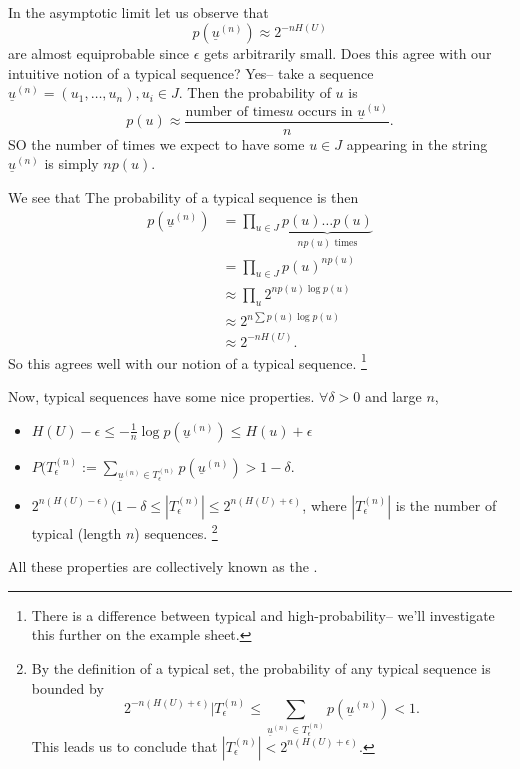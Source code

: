 In the asymptotic limit let us observe that
\begin{equation}
    p(\underline{u}^{(n)})\approx 2^{-nH(U)}
\end{equation}
are almost equiprobable since $\epsilon$ gets arbitrarily small. Does this agree with our intuitive notion of a typical sequence? Yes-- take a sequence $\underline{u}^{(n)}=(u_1,\ldots, u_n), u_i \in J$. Then the probability of $u$ is 
\begin{equation*}
    p(u)\approx \frac{\text{number of times} u\text{ occurs in } \underline{u}^{(u)}}{n}.
\end{equation*}
SO the number of times we expect to have some $u\in J$ appearing in the string $\underline{u}^{(n)}$ is simply $np(u)$.

We see that The probability of a typical sequence is then
\begin{align*}
    p(\underline{u}^{(n)}) &= \prod_{u\in J} \underbrace{p(u)\ldots p(u)}_{n p(u)\text{ times}}\\
    &= \prod_{u\in J} p(u)^{np(u)}\\
    &\approx \prod_u 2^{np(u) \log p(u)}\\
    &\approx 2^{n\sum p(u) \log p(u)}\\
    &\approx 2^{-n H(U)}.
\end{align*}
So this agrees well with our notion of a typical sequence.%
    \footnote{There is a difference between typical and high-probability-- we'll investigate this further on the example sheet.}
    
Now, typical sequences have some nice properties. $\forall \delta > 0$ and large $n$,
\begin{itemize}
    \item $H(U)-\epsilon \leq -\frac{1}{n}\log p(\underline{u}^{(n)}) \leq H(u)+\epsilon$
    \item $P(T_\epsilon^{(n)} := \sum_{\underline {u}^{(n)}\in T_\epsilon^{(n)}} p(\underline{u}^{(n)}) > 1-\delta$.
    \item $2^{n(H(U)-\epsilon)}(1-\delta \leq |T_\epsilon^{(n)}| \leq 2^{n(H(U)+\epsilon)}$, where $|T_\epsilon^{(n)}|$ is the number of typical (length $n$) sequences.%
        \footnote{By the definition of a typical set, the probability of any typical sequence is bounded by
        \begin{equation*}
            2^{-n(H(U)+\epsilon)} |T_\epsilon^{(n)} \leq \sum_{\underline{u}^{(n)}\in T_\epsilon^{(n)}} p(\underline{u}^{(n)}) < 1.
        \end{equation*}
        This leads us to conclude that $|T_\epsilon^{(n)}| < 2^{n(H(U)+\epsilon)}.$
        }
\end{itemize}
All these properties are collectively known as the .

